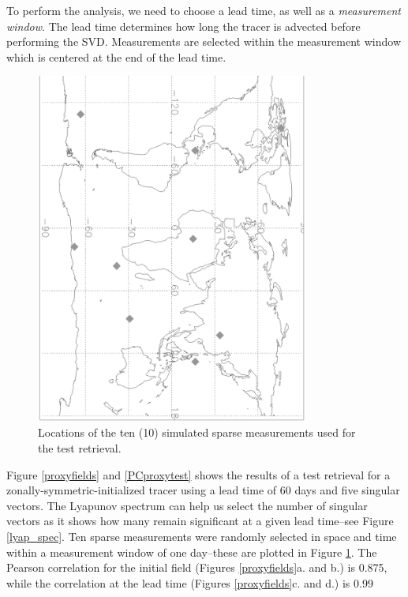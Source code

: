 To perform the analysis, we need to choose a lead time, as well as
a \textit{measurement window}.
The lead time determines how long the tracer is advected before performing
the SVD.
Measurements are selected within the measurement window which is centered
at the end of the lead time.

\begin{figure}
\begin{center}
\includegraphics[angle=90,width=0.8\textwidth]{meas_loc.eps}
\caption{Locations of the ten (10) simulated sparse measurements used for the
test retrieval.}\label{sparse}
\end{center}
\end{figure}

Figure \ref{proxyfields} and \ref{PCproxytest} 
shows the results of a test retrieval for a 
zonally-symmetric-initialized tracer using a lead time of 60 days
and five singular vectors.
The Lyapunov spectrum can help us select the number of singular vectors
as it shows how many remain significant at
a given lead time--see Figure \ref{lyap_spec}.
Ten sparse measurements were randomly selected in space and time
within a measurement window of one day--these are plotted in Figure \ref{sparse}.
The Pearson correlation for the initial field (Figures \ref{proxyfields}a. and b.)
is 0.875, while the correlation at the lead time 
(Figures \ref{proxyfields}c. and d.) is 0.99

